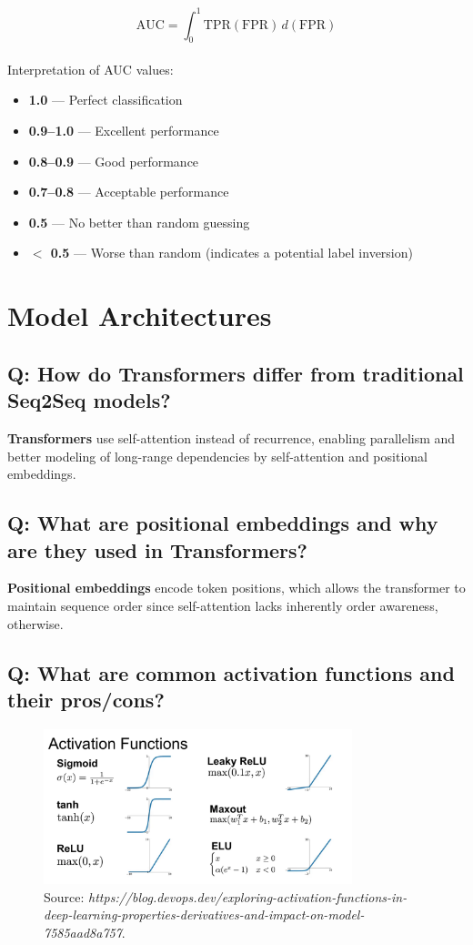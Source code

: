 \documentclass[11pt]{article}
\begin{document}
\[
	\text{AUC} = \int_{0}^{1} \text{TPR}(\text{FPR}) \, d(\text{FPR})
\]
\\
Interpretation of AUC values:
\begin{itemize}
	\item \textbf{1.0} — Perfect classification
	\item \textbf{0.9–1.0} — Excellent performance
	\item \textbf{0.8–0.9} — Good performance
	\item \textbf{0.7–0.8} — Acceptable performance
	\item \textbf{0.5} — No better than random guessing
	\item \textbf{$<$ 0.5} — Worse than random (indicates a potential label inversion)
\end{itemize}

\section{Model Architectures}

\subsection*{Q: How do Transformers differ from traditional Seq2Seq models?}
\textbf{Transformers} use self-attention instead of recurrence, enabling parallelism and better modeling of long-range dependencies by self-attention and positional embeddings.

\subsection*{Q: What are positional embeddings and why are they used in Transformers?}
\textbf{Positional embeddings} encode token positions, which allows the transformer to maintain sequence order since self-attention lacks inherently order awareness, otherwise.

\subsection*{Q: What are common activation functions and their pros/cons?}
\begin{figure}[H]
	\centering
	\includegraphics[width=0.8\textwidth]{activation.png}
	\caption{Source: \textit{https://blog.devops.dev/exploring-activation-functions-in-deep-learning-properties-derivatives-and-impact-on-model-7585aad8a757}.}
\end{figure}
\end{document}
